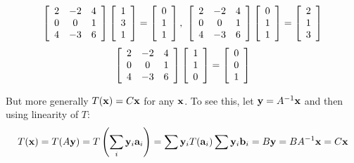 \begin{solution}
\begin{equation*}
 \left[
\begin{array}{ccc}
2 & -2 & 4 \\
0 & 0 & 1 \\
4 & -3 & 6
\end{array}
\right] \left[
\begin{array}{c}
1 \\
3 \\
1
\end{array}
\right] =\left[
\begin{array}{c}
0 \\
1 \\
1
\end{array}
\right] ,\ \left[
\begin{array}{ccc}
2 & -2 & 4 \\
0 & 0 & 1 \\
4 & -3 & 6
\end{array}
\right] \left[
\begin{array}{c}
0 \\
1 \\
1
\end{array}
\right] =\left[
\begin{array}{c}
2 \\
1 \\
3
\end{array}
\right]
\end{equation*}
\begin{equation*}
\left[
\begin{array}{ccc}
2 & -2 & 4 \\
0 & 0 & 1 \\
4 & -3 & 6
\end{array}
\right] \left[
\begin{array}{c}
1 \\
1 \\
0
\end{array}
\right] =\left[
\begin{array}{c}
0 \\
0 \\
1
\end{array}
\right]
\end{equation*}

But more generally $T({\bf x})= C{\bf x}$ for any ${\bf x}$. To see this, let ${\bf y}=A^{-1}{\bf x}$ and then using linearity of $T$:
\[ T({\bf x})= T(A{\bf y}) = T \left( \sum_i {\bf y}_i{\bf a}_i \right) = \sum {\bf y}_i T({\bf a}_i) \sum {\bf y}_i {\bf b}_i = B{\bf y} = BA^{-1}{\bf x} = C{\bf x}\]
\end{solution}


